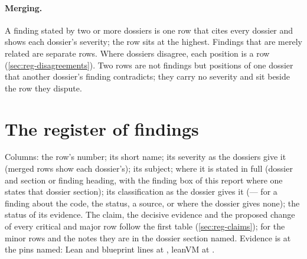\paragraph{Merging.} A finding stated by two or more dossiers is one row that cites every dossier and shows each dossier's severity; the row sits at the highest. Findings that are merely related are separate rows. Where dossiers disagree, each position is a row (\cref{sec:reg-disagreements}). Two rows are not findings but positions of one dossier that another dossier's finding contradicts; they carry no severity and sit beside the row they dispute.

\section{The register of findings}\label{sec:reg-findings}

Columns: the row's number; its short name; its severity as the dossiers give it (merged rows show each dossier's); its subject; where it is stated in full (dossier and section or finding heading, with the finding box of this report where one states that dossier section); its classification as the dossier gives it (--- for a finding about the code, the status, a source, or where the dossier gives none); the status of its evidence. The claim, the decisive evidence and the proposed change of every critical and major row follow the first table (\cref{sec:reg-claims}); for the minor rows and the notes they are in the dossier section named. Evidence is at the pins named: Lean and blueprint lines at , leanVM at .

